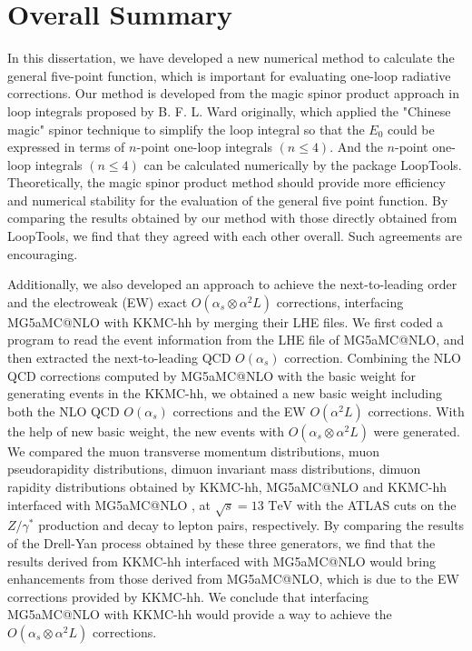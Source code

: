 \chapter{Overall Summary}
In this dissertation, we have developed a new numerical method to calculate the general five-point function, which is important for evaluating one-loop radiative corrections. Our method is developed from the magic spinor product approach in loop integrals proposed by B. F. L. Ward originally, which applied the "Chinese magic" spinor technique to simplify the loop integral so that the $E_0$ could be expressed in terms of $n$-point one-loop integrals $(n\leq4)$. And the $n$-point one-loop integrals $(n\leq4)$ can be calculated numerically by the package LoopTools. Theoretically, the magic spinor product method should provide more efficiency and numerical stability for the evaluation of the general five point function. By comparing the results obtained by our method with those directly obtained from LoopTools, we find that they agreed with each other overall. Such agreements are encouraging.

Additionally, we also developed an approach to achieve the next-to-leading order and the electroweak (EW) exact $O(\alpha_s\otimes\alpha^2L)$ corrections, interfacing MG5\textunderscore aMC@NLO with KKMC-hh by merging their LHE files. We first coded a program to read the event information from the LHE file of MG5\textunderscore aMC@NLO, and then extracted the next-to-leading QCD $O(\alpha_s)$ correction. Combining the NLO QCD corrections computed by MG5\textunderscore aMC@NLO with the basic weight for generating events in the KKMC-hh, we obtained a new basic weight including both the NLO QCD $O(\alpha_s)$ corrections and the EW $O(\alpha^2L)$ corrections. With the help of new basic weight, the new events with $O(\alpha_s\otimes\alpha^2L)$ were generated. We compared the muon transverse momentum distributions, muon pseudorapidity distributions, dimuon invariant mass distributions, dimuon rapidity distributions obtained by KKMC-hh, MG5\textunderscore aMC@NLO and KKMC-hh interfaced with MG5\textunderscore aMC@NLO , at $\sqrt{s}=13\text{ TeV}$ with the ATLAS cuts on the $Z/\gamma^\ast$ production and decay to lepton pairs, respectively. By comparing the results of the Drell-Yan process obtained by these three generators, we find that the results derived from KKMC-hh interfaced with MG5\textunderscore aMC@NLO would bring enhancements from those derived from MG5\textunderscore aMC@NLO, which is due to the EW corrections provided by KKMC-hh. We conclude that interfacing MG5\textunderscore aMC@NLO with KKMC-hh would provide a way to achieve the $O(\alpha_s\otimes\alpha^2L)$ corrections. 
 